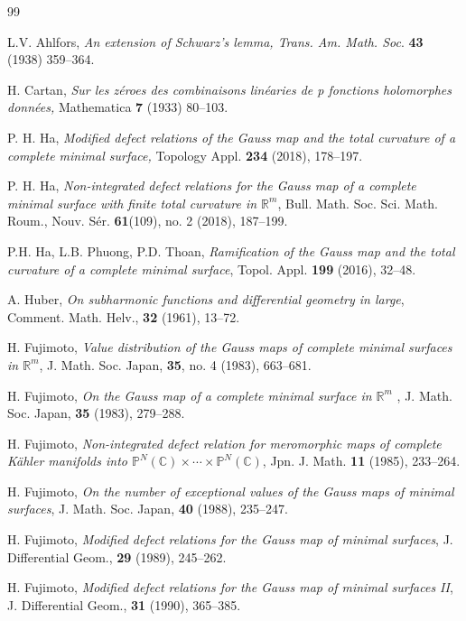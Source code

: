 \documentclass[12pt,article]{amsart}
\newcommand{\C}{{\mathbb{C}}}
\renewcommand{\P}{{\mathbb{P}}}
\newcommand{\R}{{\mathbb{R}}}
\numberwithin{equation}{section}
\begin{document}
\begin{thebibliography}{99}

 L.V. Ahlfors, \textit{An extension of Schwarz's lemma, Trans. Am. Math. Soc}. \textbf{43} (1938) 359--364.

 H. Cartan, \textit{Sur les z\'{e}roes des combinaisons lin\'{e}aries de p fonctions holomorphes donn\'{e}es,} Mathematica \textbf{7} (1933) 80--103.

 P. H. Ha, \textit{Modified defect relations of the Gauss map and the total curvature of a complete minimal surface,} Topology Appl. \textbf{234} (2018), 178--197.

 P. H. Ha, \textit{Non-integrated defect relations for the Gauss map of a complete minimal surface with finite total curvature in $\R^m$}, Bull. Math. Soc. Sci. Math. Roum., Nouv. Sér. \textbf{61}(109), no. 2 (2018), 187--199.

 P.H. Ha, L.B. Phuong, P.D. Thoan, \textit{Ramification of the Gauss map and the total curvature of a complete minimal surface}, Topol. Appl. \textbf{199} (2016), 32--48.

 A. Huber, \textit{On subharmonic functions and differential geometry in large}, Comment. Math. Helv., \textbf{32} (1961), 13--72.

 H. Fujimoto, \textit{Value distribution of the Gauss maps of complete minimal surfaces in $\R^m$}, J. Math. Soc. Japan, \textbf{35}, no. 4 (1983), 663--681.

 H. Fujimoto, \textit{On the Gauss map of a complete minimal surface in $\R^m$} , J. Math. Soc. Japan, \textbf{35} (1983), 279--288.

 H. Fujimoto, \textit{Non-integrated defect relation for meromorphic maps of complete K\"{a}hler manifolds into $\P^N(\C)\times\cdots\times\P^N(\C)$}, Jpn. J. Math. \textbf{11} (1985), 233--264.

 H. Fujimoto, \textit{On the number of exceptional values of the Gauss maps of minimal surfaces}, J. Math. Soc. Japan, \textbf{40} (1988), 235--247.

 H. Fujimoto, \textit{Modified defect relations for the Gauss map of minimal surfaces}, J. Differential Geom., \textbf{29} (1989), 245--262.

 H. Fujimoto, \textit{Modified defect relations for the Gauss map of minimal surfaces II}, J. Differential Geom., \textbf{31} (1990), 365--385.


\end{thebibliography}
\end{document}
